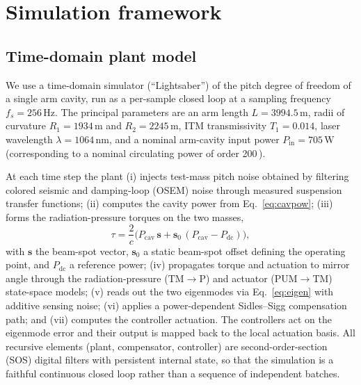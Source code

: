 \documentclass[11pt,a4paper]{article}
\newcommand{\SI}[2]{#1\,\text{#2}}
\begin{document}
\section{Simulation framework}\label{sec:framework}
\subsection{Time-domain plant model}\label{sec:fw-plant}
We use a time-domain simulator (``Lightsaber'') of the pitch degree of freedom
of a single arm cavity, run as a per-sample closed loop at a sampling frequency
$f_s = \SI{256}{Hz}$. The principal parameters are an arm length
$L = \SI{3994.5}{m}$, radii of curvature $R_1 = \SI{1934}{m}$ and
$R_2 = \SI{2245}{m}$, ITM transmissivity $T_1 = 0.014$, laser wavelength
$\lambda = \SI{1064}{nm}$, and a nominal arm-cavity input power
$P_{\mathrm{in}} = \SI{705}{W}$ (corresponding to a nominal circulating power of
order \SI{200}{kW}).

At each time step the plant (i) injects test-mass pitch noise obtained by
filtering colored seismic and damping-loop (OSEM) noise through measured
suspension transfer functions; (ii) computes the cavity power from
Eq.~\eqref{eq:cavpow}; (iii) forms the radiation-pressure torques on the two
masses,
\begin{equation}
  \tau = \frac{2}{c}\Big(P_{\mathrm{cav}}\,\mathbf{s} + \mathbf{s}_0\,(P_{\mathrm{cav}}-P_{\mathrm{dc}})\Big),
  \label{eq:torque}
\end{equation}
with $\mathbf{s}$ the beam-spot vector, $\mathbf{s}_0$ a static beam-spot offset
defining the operating point, and $P_{\mathrm{dc}}$ a reference power; (iv)
propagates torque and actuation to mirror angle through the radiation-pressure
($\mathrm{TM}{\to}\mathrm{P}$) and actuator ($\mathrm{PUM}{\to}\mathrm{TM}$)
state-space models; (v) reads out the two eigenmodes via
Eq.~\eqref{eq:eigen} with additive sensing noise; (vi) applies a
power-dependent Sidles--Sigg compensation path; and (vii) computes the
controller actuation. The controllers act on the eigenmode error and their
output is mapped back to the local actuation basis. All recursive elements
(plant, compensator, controller) are second-order-section (SOS) digital filters
with persistent internal state, so that the simulation is a faithful continuous
closed loop rather than a sequence of independent batches.
\end{document}
